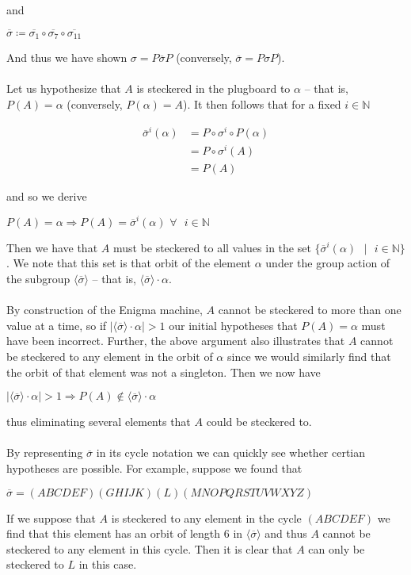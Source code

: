 and
\begin{center}
  $\overline{\sigma} \coloneq
  \overline{\sigma_{1}}\circ\overline{\sigma_7}\circ\overline{\sigma_{11}}$
\end{center}
And thus we have shown $\sigma = P\overline{\sigma}P$ (conversely,
$\overline\sigma = P\sigma P$).
\\\\Let us hypothesize that $A$ is steckered in the plugboard to
$\alpha$ -- that is, $P(A) = \alpha$ (conversely, $P(\alpha) = A$).
It then follows that for a fixed $i\in\mathbb{N}$
\begin{center}
  \begin{align*}
    \overline{\sigma}^i(\alpha) & = P\circ\sigma^i\circ P(\alpha)
    \\&= P\circ\sigma^i(A)
    \\&= P(A)
  \end{align*}
\end{center}
and so we derive
\begin{center}
  $P(A) = \alpha \Rightarrow P(A) = \overline{\sigma}^i(\alpha)\text{
  }\forall\text{ }i\in\mathbb{N}$
\end{center}
Then we have that $A$ must be steckered to all values in the set
$\{\overline{\sigma}^i(\alpha)\text{ }\vert\text{ }i\in\mathbb{N}\}$.
We note that this set is that orbit of the element $\alpha$ under the
group action of the subgroup $\langle\overline{\sigma}\rangle$ -- that is,
$\langle\overline{\sigma}\rangle\cdot\alpha$.
\\\\By construction of the Enigma machine, $A$ cannot be steckered to
more than one value at a time, so if
$|\langle\overline{\sigma}\rangle\cdot\alpha| > 1$ our initial
hypotheses that $P(A) = \alpha$ must have been incorrect. Further,
the above argument also illustrates that $A$ cannot be steckered to
any element in the orbit of $\alpha$ since
we would similarly find that the orbit of that element was not a
singleton. Then we now have
\begin{center}
  $|\langle\overline{\sigma}\rangle\cdot\alpha| > 1 \Rightarrow P(A)
  \notin \langle\overline{\sigma}\rangle\cdot\alpha$
\end{center}
thus eliminating several elements that $A$ could be steckered to.
\\\\By representing $\overline\sigma$ in its cycle notation we can
quickly see whether certian hypotheses are possible. For example,
suppose we found that
\begin{center}
  $\overline\sigma = (ABCDEF)(GHIJK)(L)(MNOPQRSTUVWXYZ)$
\end{center}
If we suppose that $A$ is steckered to any element in the cycle
$(ABCDEF)$ we find that this
element has an orbit of length $6$ in $\langle\overline\sigma\rangle$
and thus $A$ cannot be steckered
to any element in this cycle. Then it is clear that $A$ can only be
steckered to $L$ in this case.
